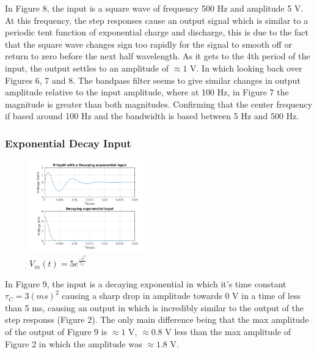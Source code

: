 \documentclass[11pt,a4paper]{article}
\begin{document}
\vspace{5mm}In Figure 8, the input is a square wave of frequency 500 Hz and amplitude 5 V. At this frequency, the step responses cause an output signal which is similar to a periodic tent function of exponential charge and discharge, this is due to the fact that the square wave changes sign too rapidly for the signal to smooth off or return to zero before the next half wavelength. As it gets to the 4th period of the input, the output settles to an amplitude of $\approx 1$ V. In which looking back over Figures 6, 7 and 8. The bandpass filter seems to give similar changes in output amplitude relative to the input amplitude, where at 100 Hz, in Figure 7 the magnitude is greater than both magnitudes. Confirming that the center frequency if based around 100 Hz and the bandwidth is based between 5 Hz and 500 Hz.

\subsubsection{Exponential Decay Input}

\begin{figure}
    \vspace{-23mm}
  		\includegraphics[width=0.45\textwidth]{Ex3_Figs/DecExp.png}
	\vspace{-6mm}
  	\caption{$V_{in}(t)= 5e^{\frac{-t^2}{\tau_C}}$}
  	\label{fig:ex3g8}
\end{figure}

In Figure 9, the input is a decaying exponential in which it's time constant $\tau_C = 3 (ms)^2$ causing a sharp drop in amplitude towards 0 V in a time of less than 5 ms, causing an output in which is incredibly similar to the output of the step responss (Figure 2). The only main difference being that the max amplitude of the output of Figure 9 is $\approx 1$ V, $\approx 0.8$ V less than the max amplitude of Figure 2 in which the amplitude was $\approx 1.8$ V.

\pagebreak
\end{document}
